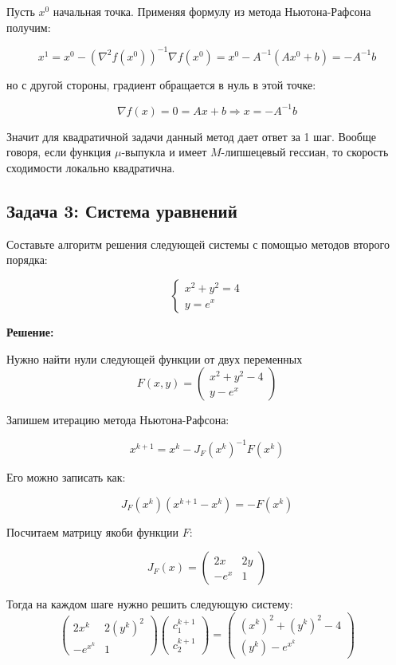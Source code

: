 {Пусть \( x^{0} \) начальная точка. Применяя формулу из метода Ньютона-Рафсона получим:

\[
    x^{1} = x^{0} - \left(\nabla^{2} f(x^{0})\right)^{-1}\nabla f(x^{0}) = x^{0} - A^{-1}\left(Ax^{0} + b\right) = -A^{-1}b
\]

но с другой стороны, градиент обращается в нуль в этой точке:

\[
    \nabla f(x) = 0 = Ax + b \Rightarrow x = -A^{-1}b
\]


Значит для квадратичной задачи данный метод дает ответ за 1 шаг. Вообще говоря, если функция $\mu$-выпукла и имеет $M$-липшецевый гессиан, то скорость сходимости локально квадратична.

\subsection*{Задача 3: Система уравнений}

Составьте алгоритм решения следующей системы с помощью методов второго порядка:

\[
    \begin{cases}
        x^{2} + y^{2} = 4 \\
        y = e^{x}
    \end{cases}
\]

\textbf{Решение:}

Нужно найти нули следующей функции от двух переменных
\[
    F(x, y) =
    \begin{pmatrix}
        x^{2} + y^{2} - 4 \\
        y - e^x
    \end{pmatrix}
\]

Запишем итерацию метода Ньютона-Рафсона:

\[
    x^{k + 1} = x^{k} - J_{F}(x^{k})^{-1}F(x^{k})
\]

Его можно записать как:

\[
    J_{F}(x^{k})(x^{k + 1} - x^{k}) = -F(x^{k})
\]

Посчитаем матрицу якоби функции $F$:

\[
    J_{F}(x) =
    \begin{pmatrix}
        2x   & 2y \\
        -e^x & 1
    \end{pmatrix}
\]

Тогда на каждом шаге нужно решить следующую систему:
\[
    \begin{pmatrix}
        2x^{k}     & 2(y^{k})^{2} \\
        -e^{x^{k}} & 1
    \end{pmatrix}
    \begin{pmatrix}
        c_{1}^{k + 1} \\
        c_{2}^{k + 1}
    \end{pmatrix}
    =
    \begin{pmatrix}
        (x^{k})^2 + (y^{k})^2 - 4 \\
        (y^{k}) - e^{x^{k}}
    \end{pmatrix}
\]

}

